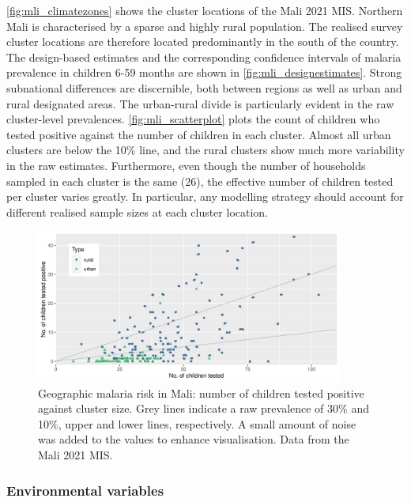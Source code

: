 \autoref{fig:mli_climatezones} shows the cluster locations of the Mali 2021 MIS. Northern Mali is characterised by a sparse and highly rural population. The realised survey cluster locations are therefore located predominantly in the south of the country. The design-based estimates and the corresponding confidence intervals of malaria prevalence in children 6-59 months are shown in \autoref{fig:mli_designestimates}. Strong subnational differences are discernible, both between regions as well as urban and rural designated areas. The urban-rural divide is particularly evident in the raw cluster-level prevalences. \autoref{fig:mli_scatterplot} plots the count of children who tested positive against the number of children in each cluster. Almost all urban clusters are below the 10\% line, and the rural clusters show much more variability in the raw estimates. Furthermore, even though the number of households sampled in each cluster is the same (26), the effective number of children tested per cluster varies greatly. In particular, any modelling strategy should account for different realised sample sizes at each cluster location. 

\begin{figure}[!t]
    \centering
    \includegraphics[width=0.9\textwidth, keepaspectratio]{figures/mali_scatterplot.png}
    \caption{Geographic malaria risk in Mali: number of children tested positive against cluster size. Grey lines indicate a raw prevalence of 30\% and 10\%, upper and lower lines, respectively. A small amount of noise was added to the values to enhance visualisation. Data from the Mali 2021 MIS.}
    \label{fig:mli_scatterplot}
\end{figure}


\subsubsection*{Environmental variables}

